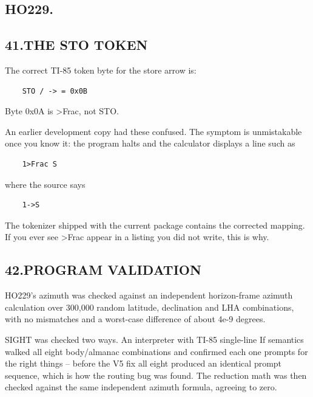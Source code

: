 \documentclass[11pt]{article}
\begin{document}
\subsection*{HO229.}

\subsection*{41.\quad THE STO TOKEN}

The correct TI-85 token byte for the store arrow is:

\begin{verbatim}
    STO / -> = 0x0B
\end{verbatim}

Byte 0x0A is >Frac, not STO.

An earlier development copy had these confused. The symptom is unmistakable once you know it: the program halts and the calculator displays a line such as

\begin{verbatim}
    1>Frac S
\end{verbatim}

where the source says

\begin{verbatim}
    1->S
\end{verbatim}

The tokenizer shipped with the current package contains the corrected mapping. If you ever see >Frac appear in a listing you did not write, this is why.

\subsection*{42.\quad PROGRAM VALIDATION}

HO229's azimuth was checked against an independent horizon-frame azimuth calculation over 300,000 random latitude, declination and LHA combinations, with no mismatches and a worst-case difference of about 4e-9 degrees.

SIGHT was checked two ways. An interpreter with TI-85 single-line If semantics walked all eight body/almanac combinations and confirmed each one prompts for the right things -- before the V5 fix all eight produced an identical prompt sequence, which is how the routing bug was found. The reduction math was then checked against the same independent azimuth formula, agreeing to zero.
\end{document}
